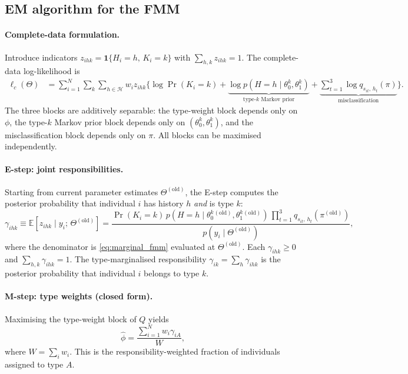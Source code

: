 \documentclass[12pt]{article}
\begin{document}
\subsection{EM algorithm for the FMM}

\paragraph{Complete-data formulation.}
Introduce indicators \(z_{ihk} = \mathbf{1}\{H_i = h,\, K_i = k\}\)
with \(\sum_{h,k} z_{ihk} = 1\). The complete-data log-likelihood is
\begin{align}
\ell_c(\Theta) &= \sum_{i=1}^{N} \sum_{k} \sum_{h \in \mathcal{H}}
  w_i z_{ihk} \bigg\{
    \log \Pr(K_i = k) +
    \underbrace{\log p(H = h \mid \theta_0^k, \theta_1^k)}_{\text{type-}k\text{ Markov prior}}
    + \underbrace{\sum_{t=1}^{3} \log q_{s_{it},\, h_t}(\pi)}_{\text{misclassification}}
  \bigg\}.
\label{eq:complete_ll_fmm}
\end{align}
The three blocks are additively separable: the type-weight block depends
only on \(\phi\), the type-\(k\) Markov prior block depends only on
\((\theta_0^k, \theta_1^k)\), and the misclassification block depends
only on \(\pi\). All blocks can be maximised independently.

\paragraph{E-step: joint responsibilities.}
Starting from current parameter estimates \(\Theta^{(\text{old})}\),
the E-step computes the posterior probability that individual \(i\) has
history \(h\) \emph{and} is type \(k\):
\begin{equation}
\gamma_{ihk} \equiv \mathbb{E}[z_{ihk} \mid y_i;\, \Theta^{(\text{old})}]
= \frac{
  \Pr(K_i = k)\,
  p(H = h \mid \theta_0^k{}^{(\text{old})}, \theta_1^k{}^{(\text{old})})\,
  \prod_{t=1}^{3} q_{s_{it},\, h_t}(\pi^{(\text{old})})
}{
  p(y_i \mid \Theta^{(\text{old})})
},
\label{eq:responsibility_fmm}
\end{equation}
where the denominator is \eqref{eq:marginal_fmm} evaluated at
\(\Theta^{(\text{old})}\). Each \(\gamma_{ihk} \geq 0\) and
\(\sum_{h,k} \gamma_{ihk} = 1\). The type-marginalised responsibility
\(\gamma_{ik} = \sum_{h} \gamma_{ihk}\) is the posterior probability
that individual \(i\) belongs to type \(k\).

\paragraph{M-step: type weights (closed form).}
Maximising the type-weight block of \(Q\) yields
\begin{equation}
\hat{\phi} = \frac{\sum_{i=1}^{N} w_i \gamma_{iA}}{W},
\label{eq:mstep_phi}
\end{equation}
where \(W = \sum_i w_i\). This is the responsibility-weighted fraction
of individuals assigned to type \(A\).
\end{document}
